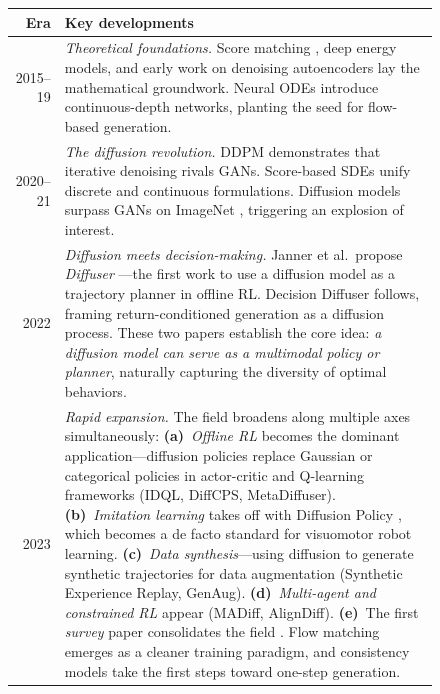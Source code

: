 \documentclass[11pt]{article}
\begin{document}
\begin{figure}[h]
\centering
\small
\setlength{\tabcolsep}{3pt}
\begin{tabular}{@{}r p{}@{}}
\toprule
\textbf{Era} & \textbf{Key developments} \\
\midrule
2015--19 & \emph{Theoretical foundations.}
Score matching \citep{vincent2011connection}, deep energy models, and early work on denoising autoencoders lay the mathematical groundwork.
Neural ODEs \citep{chen2018neuralode} introduce continuous-depth networks, planting the seed for flow-based generation. \\[4pt]

2020--21 & \emph{The diffusion revolution.}
DDPM \citep{ho2020denoising} demonstrates that iterative denoising rivals GANs.
Score-based SDEs \citep{song2021scorebased} unify discrete and continuous formulations.
Diffusion models surpass GANs on ImageNet \citep{dhariwal2021diffusion}, triggering an explosion of interest. \\[4pt]

2022 & \emph{Diffusion meets decision-making.}
Janner et al.\ propose \emph{Diffuser} \citep{janner2022planning}---the first work to use a diffusion model as a trajectory planner in offline RL.
Decision Diffuser follows, framing return-conditioned generation as a diffusion process.
These two papers establish the core idea: \emph{a diffusion model can serve as a multimodal policy or planner}, naturally capturing the diversity of optimal behaviors. \\[4pt]

2023 & \emph{Rapid expansion.}
The field broadens along multiple axes simultaneously:
\textbf{(a)}~\emph{Offline RL} becomes the dominant application---diffusion policies replace Gaussian or categorical policies in actor-critic and Q-learning frameworks (IDQL, DiffCPS, MetaDiffuser).
\textbf{(b)}~\emph{Imitation learning} takes off with Diffusion Policy \citep{chi2023diffusion}, which becomes a de facto standard for visuomotor robot learning.
\textbf{(c)}~\emph{Data synthesis}---using diffusion to generate synthetic trajectories for data augmentation (Synthetic Experience Replay, GenAug).
\textbf{(d)}~\emph{Multi-agent and constrained RL} appear (MADiff, AlignDiff).
\textbf{(e)}~The first \emph{survey} paper consolidates the field \citep{zhu2023diffusion}.
Flow matching \citep{lipman2023flow,liu2023flow} emerges as a cleaner training paradigm, and consistency models \citep{song2023consistency} take the first steps toward one-step generation. \\[4pt]


\end{tabular}
\end{figure}
\end{document}
